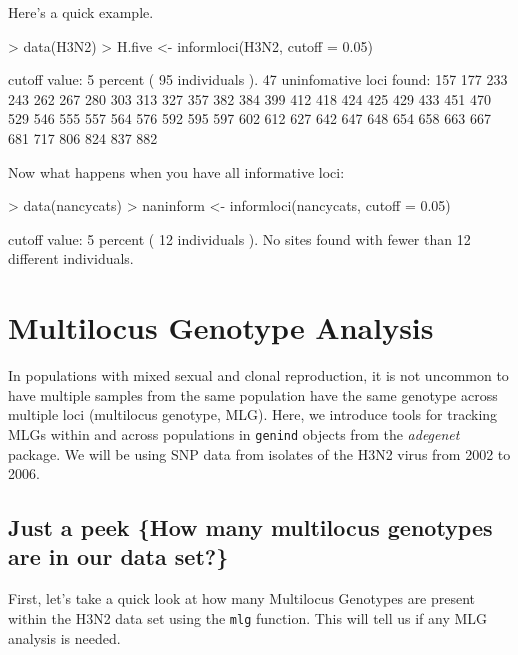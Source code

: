 \documentclass[letterpaper]{article}
\newcommand{\tab}{\hspace*{1em}}
\begin{document}
Here's a quick example.
\begin{Schunk}
\begin{Sinput}
> data(H3N2)
> H.five <- informloci(H3N2, cutoff = 0.05)
\end{Sinput}
\end{Schunk}
\begin{Schunk}
\begin{Soutput}
cutoff value: 5 percent ( 95 individuals ).
 47 uninfomative loci found: 157 
177 233 243 262 267 280 303 313 327 357 382 384 399 412 418 424 425 429 433 451 
470 529 546 555 557 564 576 592 595 597 602 612 627 642 647 648 654 658 663 667 
681 717 806 824 837 882
\end{Soutput}
\end{Schunk}
Now what happens when you have all informative loci:
\begin{Schunk}
\begin{Sinput}
> data(nancycats)
> naninform <- informloci(nancycats, cutoff = 0.05)
\end{Sinput}
\begin{Soutput}
cutoff value: 5 percent ( 12 individuals ).
No sites found with fewer than 12 different individuals.
\end{Soutput}
\end{Schunk}

\section{Multilocus Genotype Analysis}\label{mlg}

\tab\tab In populations with mixed sexual and clonal reproduction, it is not uncommon to have multiple samples from the same population have the same genotype across multiple loci (multilocus genotype, MLG). Here, we introduce tools for tracking MLGs within and across populations in \texttt{genind} objects from the \textit{adegenet} package. We will be using SNP data from isolates of the H3N2 virus from 2002 to 2006.
\subsection{Just a peek \{How many multilocus genotypes are in our data set?\}}\label{mlg:mlg}

\tab\tab First, let's take a quick look at how many Multilocus Genotypes are present within the H3N2 data set using the \texttt{mlg} function. This will tell us if any MLG analysis is needed.
\end{document}

